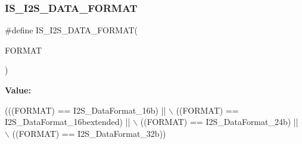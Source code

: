 \subsubsection{\texorpdfstring{I\+S\+\_\+\+I2\+S\+\_\+\+D\+A\+T\+A\+\_\+\+F\+O\+R\+M\+AT}{IS\_I2S\_DATA\_FORMAT}}
{\footnotesize\ttfamily \#define I\+S\+\_\+\+I2\+S\+\_\+\+D\+A\+T\+A\+\_\+\+F\+O\+R\+M\+AT(\begin{DoxyParamCaption}\item[{}]{F\+O\+R\+M\+AT }\end{DoxyParamCaption})}

{\bfseries Value\+:}
\begin{DoxyCode}
(((FORMAT) == I2S\_DataFormat\_16b) || \(\backslash\)
                                    ((FORMAT) == I2S\_DataFormat\_16bextended) || \(\backslash\)
                                    ((FORMAT) == I2S\_DataFormat\_24b) || \(\backslash\)
                                    ((FORMAT) == I2S\_DataFormat\_32b))
\end{DoxyCode}
